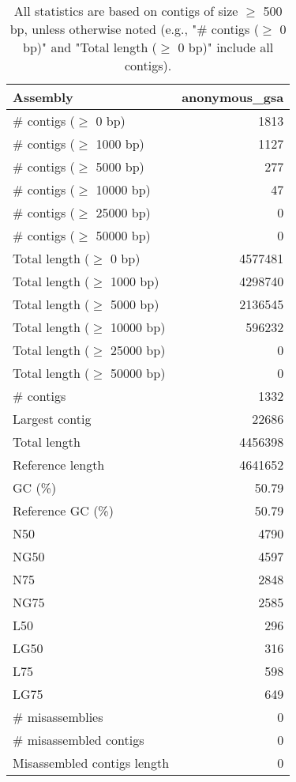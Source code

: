 \documentclass[12pt,a4paper]{article}
\begin{document}
\begin{table}[ht]
\begin{center}
\caption{All statistics are based on contigs of size $\geq$ 500 bp, unless otherwise noted (e.g., "\# contigs ($\geq$ 0 bp)" and "Total length ($\geq$ 0 bp)" include all contigs).}
\begin{tabular}{|l*{1}{|r}|}
\hline
Assembly & anonymous\_gsa \\ \hline
\# contigs ($\geq$ 0 bp) & 1813 \\ \hline
\# contigs ($\geq$ 1000 bp) & 1127 \\ \hline
\# contigs ($\geq$ 5000 bp) & 277 \\ \hline
\# contigs ($\geq$ 10000 bp) & 47 \\ \hline
\# contigs ($\geq$ 25000 bp) & 0 \\ \hline
\# contigs ($\geq$ 50000 bp) & 0 \\ \hline
Total length ($\geq$ 0 bp) & 4577481 \\ \hline
Total length ($\geq$ 1000 bp) & 4298740 \\ \hline
Total length ($\geq$ 5000 bp) & 2136545 \\ \hline
Total length ($\geq$ 10000 bp) & 596232 \\ \hline
Total length ($\geq$ 25000 bp) & 0 \\ \hline
Total length ($\geq$ 50000 bp) & 0 \\ \hline
\# contigs & 1332 \\ \hline
Largest contig & 22686 \\ \hline
Total length & 4456398 \\ \hline
Reference length & 4641652 \\ \hline
GC (\%) & 50.79 \\ \hline
Reference GC (\%) & 50.79 \\ \hline
N50 & 4790 \\ \hline
NG50 & 4597 \\ \hline
N75 & 2848 \\ \hline
NG75 & 2585 \\ \hline
L50 & 296 \\ \hline
LG50 & 316 \\ \hline
L75 & 598 \\ \hline
LG75 & 649 \\ \hline
\# misassemblies & 0 \\ \hline
\# misassembled contigs & 0 \\ \hline
Misassembled contigs length & 0 \\ \hline

\end{tabular}
\end{center}
\end{table}
\end{document}
